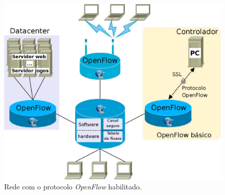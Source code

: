 \begin{figure}[h] \centering
\includegraphics[width=130mm]{openflow.png} 
\caption{Rede com o protocolo \textit{OpenFlow} habilitado.} 
\label{fig:openflow} 
\end{figure}